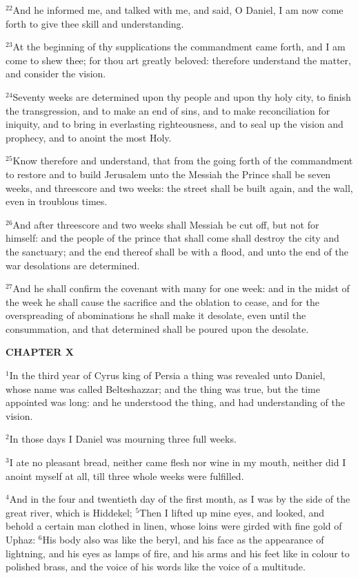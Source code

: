 \documentclass[12pt]{article}
\begin{document}
$^{22}$And he informed me, and talked with me, and said, O Daniel, I am
now come forth to give thee skill and understanding.


$^{23}$At the beginning of thy supplications the commandment came forth,
and I am come to shew thee; for thou art greatly beloved: therefore
understand the matter, and consider the vision.


$^{24}$Seventy weeks are determined upon thy people and upon thy holy
city, to finish the transgression, and to make an end of sins, and to
make reconciliation for iniquity, and to bring in everlasting
righteousness, and to seal up the vision and prophecy, and to anoint
the most Holy.


$^{25}$Know therefore and understand, that from the going forth of the
commandment to restore and to build Jerusalem unto the Messiah the
Prince shall be seven weeks, and threescore and two weeks: the street
shall be built again, and the wall, even in troublous times.


$^{26}$And after threescore and two weeks shall Messiah be cut off, but
not for himself: and the people of the prince that shall come shall
destroy the city and the sanctuary; and the end thereof shall be with
a flood, and unto the end of the war desolations are determined.


$^{27}$And he shall confirm the covenant with many for one week: and in
the midst of the week he shall cause the sacrifice and the oblation to
cease, and for the overspreading of abominations he shall make it
desolate, even until the consummation, and that determined shall be
poured upon the desolate.





\begin{center}
\textbf{\small CHAPTER X}
\end{center}
$^{1}$In the third year of Cyrus king of Persia a thing was revealed
unto Daniel, whose name was called Belteshazzar; and the thing was
true, but the time appointed was long: and he understood the thing,
and had understanding of the vision.


$^{2}$In those days I Daniel was mourning three full weeks.

$^{3}$I ate no pleasant bread, neither came flesh nor wine in my mouth,
neither did I anoint myself at all, till three whole weeks were
fulfilled.


$^{4}$And in the four and twentieth day of the first month, as I was by
the side of the great river, which is Hiddekel; $^{5}$Then I lifted up
mine eyes, and looked, and behold a certain man clothed in linen,
whose loins were girded with fine gold of Uphaz: $^{6}$His body also
was like the beryl, and his face as the appearance of lightning, and
his eyes as lamps of fire, and his arms and his feet like in colour to
polished brass, and the voice of his words like the voice of a
multitude.
\end{document}
